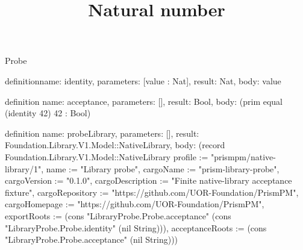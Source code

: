 \begin{lexlean}{Probe}
\title{Natural number}
\begin{semanticmodule}
definition{name: identity, parameters: [value : Nat], result: Nat, body: value}

definition{
  name: acceptance,
  parameters: [],
  result: Bool,
  body: (prim equal (identity 42) 42 : Bool)
}

definition{
  name: probeLibrary,
  parameters: [],
  result: Foundation.Library.V1.Model::NativeLibrary,
  body: (record Foundation.Library.V1.Model::NativeLibrary {profile := "prismpm/native-library/1", name := "Library probe", cargoName := "prism-library-probe", cargoVersion := "0.1.0", cargoDescription := "Finite native-library acceptance fixture", cargoRepository := "https://github.com/UOR-Foundation/PrismPM", cargoHomepage := "https://github.com/UOR-Foundation/PrismPM", exportRoots := (cons "LibraryProbe.Probe.acceptance" (cons "LibraryProbe.Probe.identity" (nil String))), acceptanceRoots := (cons "LibraryProbe.Probe.acceptance" (nil String))})
}
\end{semanticmodule}
\end{lexlean}
